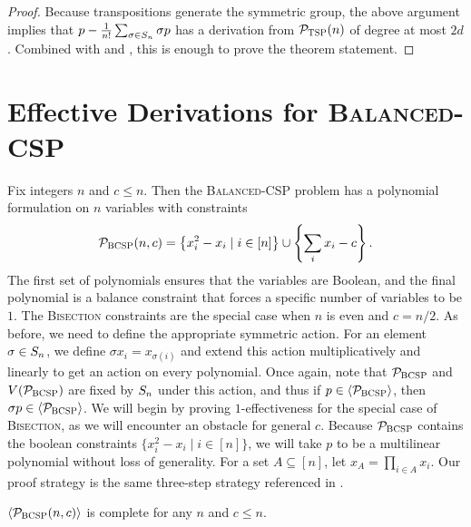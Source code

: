 \begin{proof}
Because transpositions generate the symmetric group, the above argument implies that $p - \frac{1}{n!}\sum_{\sigma \in S_{n}} \sigma p$ has a derivation from $\mathcal P_{\textsc{TSP}}(n)$ of degree at most $2d$. Combined with  and , this is enough to prove the theorem statement. 
\end{proof}

\section{Effective Derivations for \textsc{Balanced-CSP}}\label{sec:bcsp}
Fix integers $n$ and $c \leq n$. Then the \textsc{Balanced-CSP} problem has a polynomial formulation on $n$ variables with constraints
\begin{align}
\mathcal P_{\textsc{BCSP}}(n,c) = \left\{x_i^2 - x_i\mid i \in [n]\right\} \cup \left\{\sum_i x_i - c\right\}.\label{eq:bcsp-formulation}
\end{align}
The first set of polynomials ensures that the variables are Boolean, and the final polynomial is a balance constraint that forces a specific number of variables to be $1$. The \textsc{Bisection} constraints are the special case when $n$ is even and $c = n/2$. 
As before, we need to define the appropriate symmetric action. For an element $\sigma \in S_{n}$, we define $\sigma x_i = x_{\sigma(i)}$ and extend this action multiplicatively and linearly to get an action on every polynomial. 
Once again, note that $\mathcal P_{\textsc{BCSP}}$ and $V(\mathcal P_{\textsc{BCSP}})$ are fixed by $S_{n}$ under this action, and thus if $p \in \langle \mathcal P_{\textsc{BCSP}} \rangle$, then $\sigma p \in \langle \mathcal P_{\textsc{BCSP}} \rangle$. 
We will begin by proving $1$-effectiveness for the special case of \textsc{Bisection}, as we will encounter an obstacle for general $c$. 
Because $\mathcal P_{\textsc{BCSP}}$ contains the boolean constraints $\{x_i^2 - x_i \mid i \in [n]\}$, we will take $p$ to be a multilinear polynomial without loss of generality. 
For a set $A \subseteq [n]$, let $x_A = \prod_{i \in A} x_i$.
Our proof strategy is the same three-step strategy referenced in .
\begin{lemma}\label{lem:bcsp-complete}
$\langle \mathcal P_{\textsc{BCSP}}(n,c) \rangle$ is complete for any $n$ and $c \leq n$.
\end{lemma}
